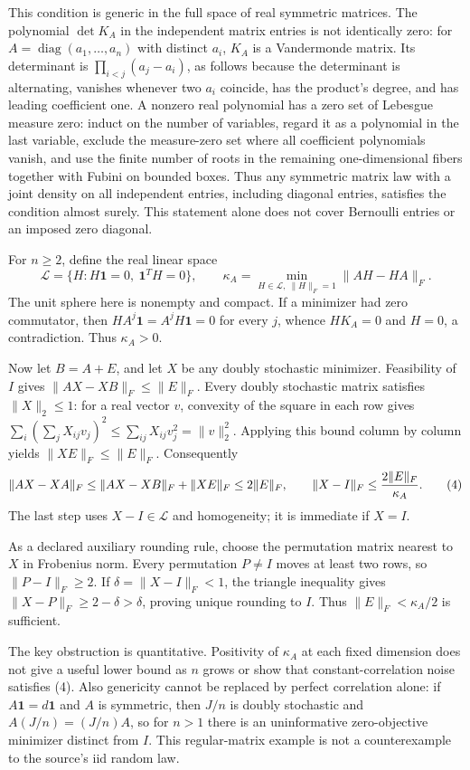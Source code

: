\documentclass[11pt]{article}
\begin{document}
This condition is generic in the full space of real symmetric matrices. The polynomial $\det K_A$ in the independent matrix entries is not identically zero: for $A=\operatorname{diag}(a_1,\ldots,a_n)$ with distinct $a_i$, $K_A$ is a Vandermonde matrix. Its determinant is $\prod_{i<j}(a_j-a_i)$, as follows because the determinant is alternating, vanishes whenever two $a_i$ coincide, has the product's degree, and has leading coefficient one. A nonzero real polynomial has a zero set of Lebesgue measure zero: induct on the number of variables, regard it as a polynomial in the last variable, exclude the measure-zero set where all coefficient polynomials vanish, and use the finite number of roots in the remaining one-dimensional fibers together with Fubini on bounded boxes. Thus any symmetric matrix law with a joint density on all independent entries, including diagonal entries, satisfies the condition almost surely. This statement alone does not cover Bernoulli entries or an imposed zero diagonal.

For $n\geq2$, define the real linear space
\[
 \mathcal L=\{H:H\mathbf1=0,\ \mathbf1^TH=0\},\qquad
 \kappa_A=\min_{H\in\mathcal L,\ \|H\|_F=1}\|AH-HA\|_F.
\]
The unit sphere here is nonempty and compact. If a minimizer had zero commutator, then $HA^j\mathbf1=A^jH\mathbf1=0$ for every $j$, whence $HK_A=0$ and $H=0$, a contradiction. Thus $\kappa_A>0$.

Now let $B=A+E$, and let $X$ be any doubly stochastic minimizer. Feasibility of $I$ gives $\|AX-XB\|_F\leq\|E\|_F$. Every doubly stochastic matrix satisfies $\|X\|_2\leq1$: for a real vector $v$, convexity of the square in each row gives $\sum_i(\sum_jX_{ij}v_j)^2\leq\sum_{ij}X_{ij}v_j^2=\|v\|_2^2$. Applying this bound column by column yields $\|XE\|_F\leq\|E\|_F$. Consequently
\[
 \|AX-XA\|_F\leq\|AX-XB\|_F+\|XE\|_F\leq2\|E\|_F,
 \qquad \|X-I\|_F\leq {2\|E\|_F\over\kappa_A}.       \tag{4}
\]
The last step uses $X-I\in\mathcal L$ and homogeneity; it is immediate if $X=I$.

As a declared auxiliary rounding rule, choose the permutation matrix nearest to $X$ in Frobenius norm. Every permutation $P\ne I$ moves at least two rows, so $\|P-I\|_F\geq2$. If $\delta=\|X-I\|_F<1$, the triangle inequality gives $\|X-P\|_F\geq2-\delta>\delta$, proving unique rounding to $I$. Thus $\|E\|_F<\kappa_A/2$ is sufficient.

The key obstruction is quantitative. Positivity of $\kappa_A$ at each fixed dimension does not give a useful lower bound as $n$ grows or show that constant-correlation noise satisfies (4). Also genericity cannot be replaced by perfect correlation alone: if $A\mathbf1=d\mathbf1$ and $A$ is symmetric, then $J/n$ is doubly stochastic and $A(J/n)=(J/n)A$, so for $n>1$ there is an uninformative zero-objective minimizer distinct from $I$. This regular-matrix example is not a counterexample to the source's iid random law.
\end{document}
